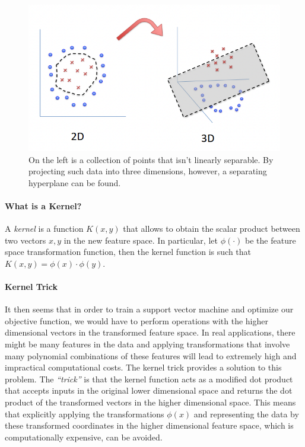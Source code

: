 \begin{figure}[h]
    \centering
    \includegraphics[scale=0.75]{images/svm/higher-dim-transform.png}
    \caption{On the left is a collection of points that isn't linearly separable. By projecting such data into three dimensions, however, a separating hyperplane can be found.}
    \label{fig:svm_higher_dim_transform}
\end{figure}

\paragraph{What is a Kernel?} A \textit{kernel} is a function $K(x, y)$ that allows to obtain the scalar product between two vectors $x, y$ in the new feature space. In particular, let $\phi(\cdot)$ be the feature space transformation function, then the kernel function is such that $K(x, y) = \phi(x) \cdot \phi(y)$.

\paragraph{Kernel Trick} It then seems that in order to train a support vector machine and optimize our objective function, we would have to perform operations with the higher dimensional vectors in the transformed feature space. In real applications, there might be many features in the data and applying transformations that involve many polynomial combinations of these features will lead to extremely high and impractical computational costs.
The kernel trick provides a solution to this problem. The \textit{“trick”} is that the kernel function acts as a modified dot product that accepts inputs in the original lower dimensional space and returns the dot product of the transformed vectors in the higher dimensional space. This means that explicitly applying the transformations $\phi(x)$ and representing the data by these transformed coordinates in the higher dimensional feature space, which is computationally expensive, can be avoided.

